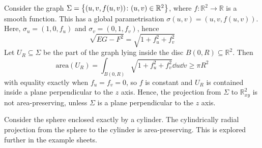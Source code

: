 \begin{example}
	Consider the graph \( \Sigma = \qty{(u,v,f(u,v)) \colon (u,v) \in \mathbb R^2} \), where \( f \colon \mathbb R^2 \to \mathbb R \) is a smooth function.
	This has a global parametrisation \( \sigma(u,v) = (u,v,f(u,v)) \).
	Here, \( \sigma_u = (1,0,f_u) \) and \( \sigma_v = (0,1,f_v) \), hence
	\[
		\sqrt{EG - F^2} = \sqrt{1+f_u^2+f_v^2}
	\]
	Let \( U_R \subseteq \Sigma \) be the part of the graph lying inside the disc \( B(0,R) \subseteq \mathbb R^2 \).
	Then
	\[
		\mathrm{area}(U_R) = \int_{B(0,R)} \sqrt{1+f_u^2+f_v^2} \dd{u}\dd{v} \geq \pi R^2
	\]
	with equality exactly when \( f_u = f_v = 0 \), so \( f \) is constant and \( U_R \) is contained inside a plane perpendicular to the \( z \) axis.
	Hence, the projection from \( \Sigma \) to \( \mathbb R^2_{xy} \) is not area-preserving, unless \( \Sigma \) is a plane perpendicular to the \( z \) axis.
\end{example}
\begin{example}
	Consider the sphere enclosed exactly by a cylinder.
	The cylindrically radial projection from the sphere to the cylinder is area-preserving.
	This is explored further in the example sheets.
\end{example}

